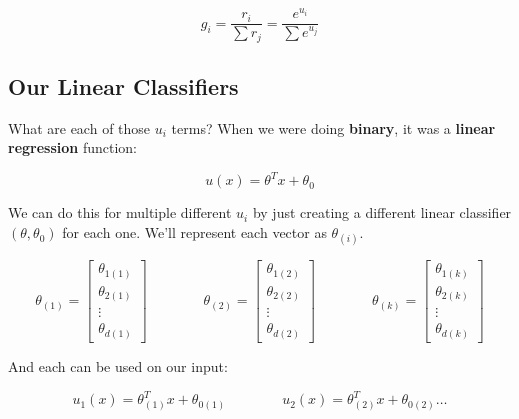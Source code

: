         \begin{equation}
             g_i 
            =             \frac{r_i}{\sum r_j} 
            = 
            \frac{e^{u_i}}{\sum e^{u_j}}
        \end{equation}
        
    \subsection*{Our Linear Classifiers}
    
        What are each of those $u_i$ terms? When we were doing \textbf{binary}, it was a \textbf{linear regression} function:
        
        \begin{equation}
            u(x) = \theta^Tx+\theta_0
        \end{equation}
        
        We can do this for multiple different $u_i$ by just creating a different linear classifier $(\theta,\theta_0)$ for each one. We'll represent each vector as $\theta_{(i)}$.
        
        \begin{equation}
            \theta_{(1)} = 
            \begin{bmatrix}
                \theta_{1(1)} \\ \theta_{2(1)} \\ \vdots \\ \theta_{d(1)}
            \end{bmatrix}
            \qquad\qquad
            \theta_{(2)} = 
            \begin{bmatrix}
                \theta_{1(2)} \\ \theta_{2(2)} \\ \vdots \\ \theta_{d(2)}
            \end{bmatrix}
            \qquad\qquad
            \theta_{(k)} = 
            \begin{bmatrix}
                \theta_{1(k)} \\ \theta_{2(k)} \\ \vdots \\ \theta_{d(k)}
            \end{bmatrix}
        \end{equation}
        
        And each can be used on our input:
        
        \begin{equation}
            u_1(x) = \theta_{(1)}^T x + \theta_{0(1)}
            \qquad\qquad
            u_2(x) = \theta_{(2)}^T x + \theta_{0(2)}
            \dots
        \end{equation}
        
